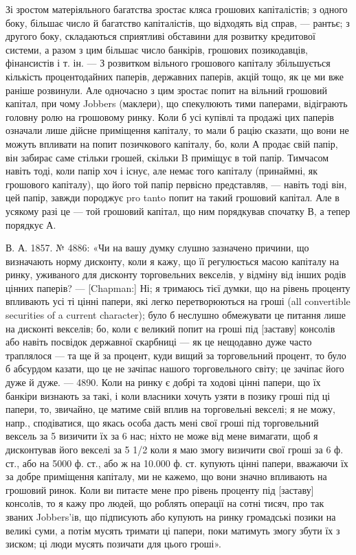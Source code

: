Зі зростом матеріяльного багатства зростає кляса грошових капіталістів;
з одного боку, більшає число й багатство капіталістів, що відходять від справ, —
рантьє; з другого боку, складаються сприятливі обставини для розвитку кредитової
системи, а разом з цим більшає число банкірів, грошових позикодавців, фінансистів
і т. ін. — З розвитком вільного грошового капіталу збільшується кількість
процентодайних паперів, державних паперів, акцій тощо, як це ми вже раніше
розвинули. Але одночасно з цим зростає попит на вільний грошовий капітал, при
чому Jobbers (маклери), що спекулюють тими паперами, відіграють головну ролю на
грошовому ринку. Коли б усі купівлі та продажі цих паперів означали лише
дійсне приміщення капіталу, то мали б рацію сказати, що вони не можуть
впливати на попит позичкового капіталу, бо, коли А продає свій папір, він
забирає саме стільки грошей, скільки B приміщує в той папір. Тимчасом навіть
тоді, коли папір хоч і існує, але немає того капіталу (принаймні, як грошового
капіталу), що його той папір первісно представляв, — навіть тоді він, цей папір,
завжди породжує pro tanto попит на такий грошовий капітал. Але в усякому
разі це — той грошовий капітал, що ним порядкував спочатку В, а тепер
порядкує А.

В. А. 1857. № 4886: «Чи на вашу думку слушно зазначено причини,
що визначають норму дисконту, коли я кажу, що її регулюється масою капіталу
на ринку, уживаного для дисконту торговельних векселів, у відміну від
інших родів цінних паперів? — [Chapman:] Ні; я тримаюсь тієї думки, що на
рівень проценту впливають усі ті цінні папери, які легко перетворюються
на гроші (all convertible securities of a current character); було б неслушно
обмежувати це питання лише на дисконті векселів; бо, коли є великий попит
на гроші під [заставу] консолів або навіть посвідок державної скарбниці — як
це нещодавно дуже часто траплялося — та ще й за процент, куди вищий за
торговельний процент, то було б абсурдом казати, що це не зачіпає нашого торговельного
світу; це зачіпає його дуже й дуже. — 4890. Коли на ринку є добрі
та ходові цінні папери, що їх банкіри визнають за такі, і коли власники
хочуть узяти в позику гроші під ці папери, то, звичайно, це матиме свій вплив на
торговельні векселі; я не можу, напр., сподіватися, що якась особа дасть мені
свої гроші під торговельний вексель за 5%
визичити їх за 6%
нас; ніхто не може від мене вимагати, щоб я дисконтував його векселі за 5 1/2%
коли я маю змогу визичити свої гроші за 6%
ф. ст., або на 5000 ф. ст., або ж на 10.000 ф. ст. купують цінні папери, вважаючи
їх за добре приміщення капіталу, ми не кажемо, що вони значно впливають
на грошовий ринок. Коли ви питаєте мене про рівень проценту під [заставу]
консолів, то я кажу про людей, що роблять операції на сотні тисяч, про так
званих Jobbers’iв, що підписують або купують на ринку громадські позики на
великі суми, а потім мусять тримати ці папери, поки матимуть змогу збути їх
з зиском; ці люди мусять позичати для цього гроші».

